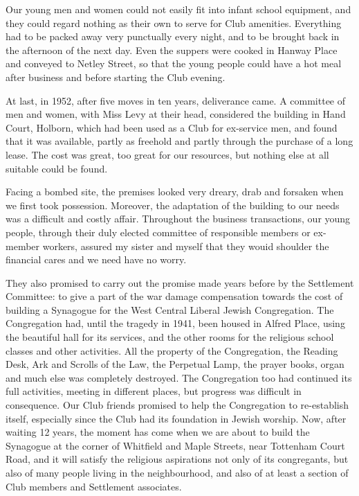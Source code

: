 Our young men and women could not easily fit into
infant school equipment, and they could regard nothing
as their own to serve for Club amenities. Everything had
to be packed away very punctually every night, and to
be brought back in the afternoon of the next day. Even
the suppers were cooked in Hanway Place and conveyed
to Netley Street, so that the young people could have
a hot meal after business and before starting the Club
evening.

At last, in 1952, after five moves in ten years, deliverance
came. A committee of men and women, with Miss
Levy at their head, considered the building in Hand
Court, Holborn, which had been used as a Club for
ex-service men, and found that it was available, partly
as freehold and partly through the purchase of a long
lease. The cost was great, too great for our resources,
but nothing else at all suitable could be found.

Facing a bombed site, the premises looked very dreary,
drab and forsaken when we first took possession.
Moreover, the adaptation of the building to our needs
was a difficult and costly affair. Throughout the business
transactions, our young people, through their duly
elected committee of responsible members or ex-member
workers, assured my sister and myself that they wouid
shoulder the financial cares and we need have no worry.

They also promised to carry out the promise made
years before by the Settlement Committee: to give a
part of the war damage compensation towards the cost
of building a Synagogue for the West Central Liberal
Jewish Congregation. The Congregation had, until the
tragedy in 1941, been housed in Alfred Place, using the
beautiful hall for its services, and the other rooms for
the religious school classes and other activities. All the
property of the Congregation, the Reading Desk, Ark
and Scrolls of the Law, the Perpetual Lamp, the prayer
books, organ and much else was completely destroyed.
The Congregation too had continued its full activities,
meeting in different places, but progress was difficult in
consequence. Our Club friends promised to help the
Congregation to re-establish itself, especially since the
Club had its foundation in Jewish worship. Now, after
waiting 12 years, the moment has come when we are
about to build the Synagogue at the corner of Whitfield
and Maple Streets, near Tottenham Court Road, and it
will satisfy the religious aspirations not only of its
congregants, but also of many people living in the
neighbourhood, and also of at least a section of Club
members and Settlement associates.

